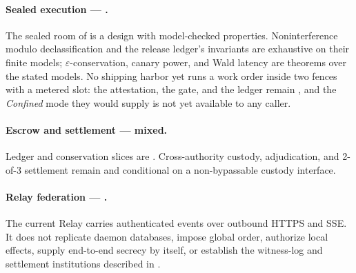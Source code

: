 \paragraph{Sealed execution --- \Designed.}
The sealed room of  is a design with
model-checked properties. Noninterference modulo declassification and the
release ledger's invariants are exhaustive on their finite models;
$\varepsilon$-conservation, canary power, and Wald latency are theorems over
the stated models. No shipping harbor yet runs a work order inside two fences
with a metered slot: the attestation, the gate, and the ledger remain
\Designed{}, and the \emph{Confined} mode they would supply is not yet
available to any caller.

\paragraph{Escrow and settlement --- mixed.}
Ledger and conservation slices are \BuiltWeak{}. Cross-authority custody,
adjudication, and 2-of-3 settlement remain \Designed{} and conditional on a
non-bypassable custody interface.

\paragraph{Relay federation --- \BuiltWeak.}
The current Relay carries authenticated events over outbound HTTPS and SSE. It
does not replicate daemon databases, impose global order, authorize local
effects, supply end-to-end secrecy by itself, or establish the witness-log and
settlement institutions described in .

{\raggedbottom
\setlength{\LTpre}{0pt}\setlength{\LTpost}{0pt}
\par}

